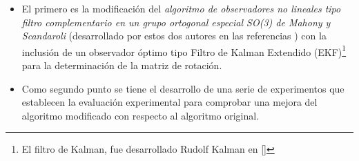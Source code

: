 \documentclass[conference]{IEEEtran}
\begin{document}
\begin{itemize}
\item El primero es la modificación del \emph{algoritmo de observadores no lineales tipo filtro complementario en un grupo ortogonal especial SO(3) de Mahony y Scandaroli} (desarrollado por estos dos autores en las referencias \cite{Mahony2008,Scandaro2011}) con la inclusión de un observador óptimo tipo Filtro de Kalman Extendido (EKF)\footnote{El filtro de Kalman, fue desarrollado Rudolf Kalman en [\cite{Kalman1960}]} para la determinación de la matriz de rotación.
\item Como segundo punto se tiene el desarrollo de una serie de experimentos que establecen la evaluación experimental para comprobar una mejora del algoritmo modificado con respecto al algoritmo original. \end{itemize}\par
\end{document}
